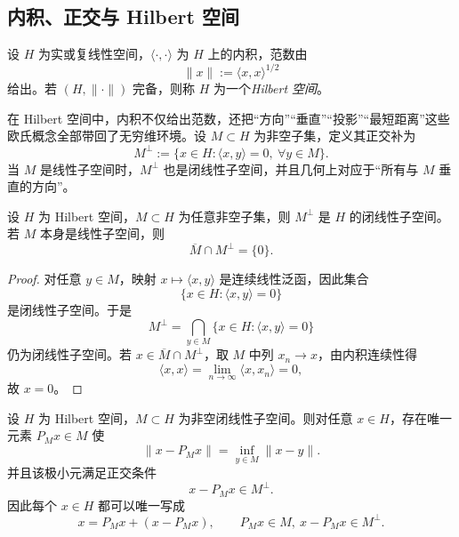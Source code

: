 \subsection{内积、正交与 Hilbert 空间}

\begin{definition}[Hilbert 空间]\label{def:hilbert-space}
设 $H$ 为实或复线性空间，$\langle\cdot,\cdot\rangle$ 为 $H$ 上的内积，范数由
\[
\|x\|:=\langle x,x\rangle^{1/2}
\]
给出。若 $(H,\|\cdot\|)$ 完备，则称 $H$ 为一个\emph{Hilbert 空间}。
\end{definition}

在 Hilbert 空间中，内积不仅给出范数，还把“方向”“垂直”“投影”“最短距离”这些欧氏概念全部带回了无穷维环境。设 $M\subset H$ 为非空子集，定义其正交补为
\[
M^\perp:=\{x\in H:\langle x,y\rangle=0,\ \forall y\in M\}.
\]
当 $M$ 是线性子空间时，$M^\perp$ 也是闭线性子空间，并且几何上对应于“所有与 $M$ 垂直的方向”。

\begin{proposition}[正交补的基本性质]
设 $H$ 为 Hilbert 空间，$M\subset H$ 为任意非空子集，则 $M^\perp$ 是 $H$ 的闭线性子空间。若 $M$ 本身是线性子空间，则
\[
\overline{M}\cap M^\perp=\{0\}.
\]
\end{proposition}

\begin{proof}
对任意 $y\in M$，映射 $x\mapsto \langle x,y\rangle$ 是连续线性泛函，因此集合
\[
\{x\in H:\langle x,y\rangle=0\}
\]
是闭线性子空间。于是
\[
M^\perp=\bigcap_{y\in M}\{x\in H:\langle x,y\rangle=0\}
\]
仍为闭线性子空间。若 $x\in \overline{M}\cap M^\perp$，取 $M$ 中列 $x_n\to x$，由内积连续性得
\[
\langle x,x\rangle=\lim_{n\to\infty}\langle x,x_n\rangle=0,
\]
故 $x=0$。
\end{proof}

\begin{theorem}\label{thm:orthogonal-projection}
设 $H$ 为 Hilbert 空间，$M\subset H$ 为非空闭线性子空间。则对任意 $x\in H$，存在唯一元素 $P_Mx\in M$ 使
\[
\|x-P_Mx\|=\inf_{y\in M}\|x-y\|.
\]
并且该极小元满足正交条件
\[
x-P_Mx\in M^\perp.
\]
因此每个 $x\in H$ 都可以唯一写成
\[
x=P_Mx+(x-P_Mx),\qquad P_Mx\in M,\ x-P_Mx\in M^\perp.
\]
\end{theorem}

